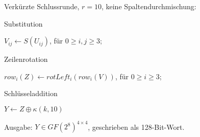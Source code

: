 \documentclass[a4paper]{article}
\begin{document}
\begin{multicols}{3}
\begin{itemize*}
\begin{enumerate*}
\begin{enumerate*}
\begin{itemize*}
                \end{itemize*}
            \end{enumerate*}
            \item Verkürzte Schlussrunde, $r=10$, keine Spaltendurchmischung:
            \begin{enumerate*}
                \item Substitution
                \begin{itemize*}
                    \item $V_{ij}\leftarrow S(U_{ij})$, für $0\geq i,j\geq 3$;
                \end{itemize*}
                \item Zeilenrotation
                \begin{itemize*}
                    \item $row_i(Z)\leftarrow rotLeft_i(row_i(V))$, für $0\geq i\geq 3$;
                \end{itemize*}
                \item Schlüsseladdition
                \begin{itemize*}
                    \item $Y\leftarrow Z\oplus \kappa (k,10)$
                \end{itemize*}
            \end{enumerate*}
            \item Ausgabe: $Y\in GF(2^8)^{4\times 4}$, geschrieben als 128-Bit-Wort.
        \end{enumerate*}
    \end{itemize*}


\end{multicols}
\end{document}
